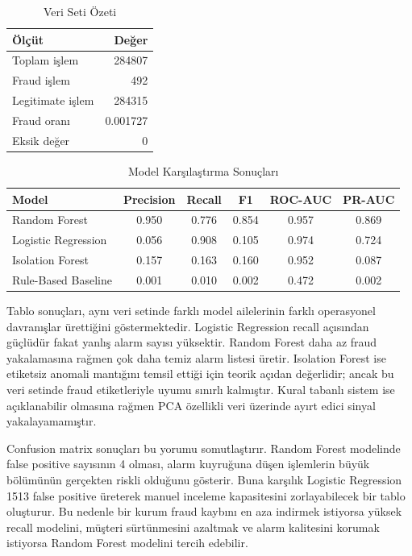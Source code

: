 \documentclass[conference]{IEEEtran}
\begin{document}
\begin{table}[H]
\caption{Veri Seti Özeti}
\label{tab:dataset}
\centering
\begin{tabular}{lr}
\toprule
Ölçüt & Değer \\
\midrule
Toplam işlem & 284807 \\
Fraud işlem & 492 \\
Legitimate işlem & 284315 \\
Fraud oranı & 0.001727 \\
Eksik değer & 0 \\
\bottomrule
\end{tabular}
\end{table}

\begin{table}[t]
\caption{Model Karşılaştırma Sonuçları}
\label{tab:metrics}
\centering
\begin{tabular}{lccccc}
\toprule
Model & Precision & Recall & F1 & ROC-AUC & PR-AUC \\
\midrule
Random Forest & 0.950 & 0.776 & 0.854 & 0.957 & 0.869 \\
Logistic Regression & 0.056 & 0.908 & 0.105 & 0.974 & 0.724 \\
Isolation Forest & 0.157 & 0.163 & 0.160 & 0.952 & 0.087 \\
Rule-Based Baseline & 0.001 & 0.010 & 0.002 & 0.472 & 0.002 \\
\bottomrule
\end{tabular}
\end{table}

Tablo sonuçları, aynı veri setinde farklı model ailelerinin farklı operasyonel davranışlar ürettiğini göstermektedir. Logistic Regression recall açısından güçlüdür fakat yanlış alarm sayısı yüksektir. Random Forest daha az fraud yakalamasına rağmen çok daha temiz alarm listesi üretir. Isolation Forest ise etiketsiz anomali mantığını temsil ettiği için teorik açıdan değerlidir; ancak bu veri setinde fraud etiketleriyle uyumu sınırlı kalmıştır. Kural tabanlı sistem ise açıklanabilir olmasına rağmen PCA özellikli veri üzerinde ayırt edici sinyal yakalayamamıştır.

Confusion matrix sonuçları bu yorumu somutlaştırır. Random Forest modelinde false positive sayısının 4 olması, alarm kuyruğuna düşen işlemlerin büyük bölümünün gerçekten riskli olduğunu gösterir. Buna karşılık Logistic Regression 1513 false positive üreterek manuel inceleme kapasitesini zorlayabilecek bir tablo oluşturur. Bu nedenle bir kurum fraud kaybını en aza indirmek istiyorsa yüksek recall modelini, müşteri sürtünmesini azaltmak ve alarm kalitesini korumak istiyorsa Random Forest modelini tercih edebilir.
\end{document}

